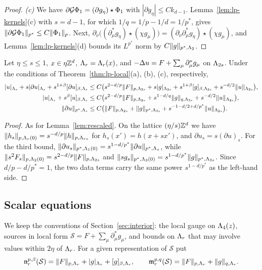 \begin{proof}
\emph{(c)} We have $\partial\mathcal G\Phi_1=(\partial g_\eta)\star\Phi_1$ with $|\partial g_\eta|\le Ck_{d-1}$. Lemma~\ref{lem:lp-kernels}(c) with $s=d-1$, for which $1/q=1/p-1/d=1/p^*$, gives $\|\partial\mathcal G\Phi_1\|_{p^*}\le C\|\Phi_1\|_p$. Next, $\partial_\nu\big((\partial^*_\mu g_\eta)\star(\chi g_\mu)\big)=(\partial_\nu\partial^*_\mu g_\eta)\star(\chi g_\mu)$, and Lemma~\ref{lem:lp-kernels}(d) bounds its $L^{p^*}$ norm by $C\|g\|_{p^*,\Lambda_2}$.
\end{proof}

\begin{lemma}\label{lem:rescaled-lp}
Let $\eta\le s\le1$, $x\in\eta\mathbb Z^d$, $\Lambda_r=\Lambda_r(x)$, and $-\Delta u=F+\sum_\mu\partial^*_\mu g_\mu$ on $\Lambda_{2s}$. Under the conditions of Theorem~\ref{thm:lp-local}(a), (b), (c), respectively,
\begin{align*}
|u|_{\Lambda_s}+s|\partial u|_{\Lambda_s}+s^{1+\beta}[\partial u]_{\beta,\Lambda_s}&\le C\big(s^{2-d/p}\|F\|_{p,\Lambda_{2s}}+s|g|_{\Lambda_{3s}}+s^{1+\beta}[g]_{\beta,\Lambda_{3s}}+s^{-d/2}\|u\|_{\Lambda_{2s}}\big),\\
|u|_{\Lambda_s}+s^\beta[u]_{\beta,\Lambda_s}&\le C\big(s^{2-d/p}\|F\|_{p,\Lambda_{2s}}+s^{1-d/q}\|g\|_{q,\Lambda_{3s}}+s^{-d/2}\|u\|_{\Lambda_{2s}}\big),\\
\|\partial u\|_{p^*,\Lambda_s}&\le C\big(\|F\|_{p,\Lambda_{2s}}+\|g\|_{p^*,\Lambda_{3s}}+s^{-1-d/2+d/p^*}\|u\|_{\Lambda_{2s}}\big).
\end{align*}
\end{lemma}

\begin{proof}
As for Lemma~\ref{lem:rescaled}. On the lattice $(\eta/s)\mathbb Z^d$ we have $\|h_s\|_{p,\Lambda_r(0)}=s^{-d/p}\|h\|_{p,\Lambda_{rs}}$ for $h_s(x')=h(x+sx')$, and $\partial u_s=s(\partial u)_s$. For the third bound, $\|\partial u_s\|_{p^*,\Lambda_1(0)}=s^{1-d/p^*}\|\partial u\|_{p^*,\Lambda_s}$, while $\|s^2F_s\|_{p,\Lambda_2(0)}=s^{2-d/p}\|F\|_{p,\Lambda_{2s}}$ and $\|sg_s\|_{p^*,\Lambda_3(0)}=s^{1-d/p^*}\|g\|_{p^*,\Lambda_{3s}}$. Since $d/p-d/p^*=1$, the two data terms carry the same power $s^{1-d/p^*}$ as the left-hand side.
\end{proof}

\subsection{Scalar equations}\label{ss:43.3}

We keep the conventions of Section~\ref{sec:interior}: the local gauge on $\Lambda_4(z)$, sources in local form $\mathcal S=F+\sum_\mu\partial^*_\mu g_\mu$, and bounds on $\Lambda_r$ that may involve values within $2\eta$ of $\Lambda_r$. For a given representation of $\mathcal S$ put
\[
\mathfrak n^{p,\beta}_r(\mathcal S)=\|F\|_{p,\Lambda_r}+|g|_{\Lambda_r}+[g]_{\beta,\Lambda_r},\qquad\mathfrak m^{p,q}_r(\mathcal S)=\|F\|_{p,\Lambda_r}+\|g\|_{q,\Lambda_r}.
\]

